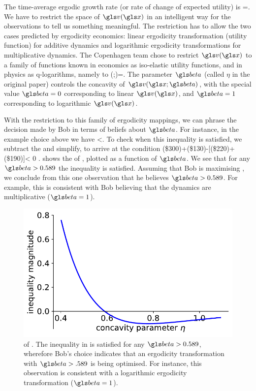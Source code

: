 The time-average ergodic growth rate (or rate of change of expected utility) is
\be
\g=\frac{\ave{\D \gv(\x)}}{\D\t}.
\ee
We have to restrict the space of $\gv(\x)$ in an intelligent way for the observations
to tell us something meaningful. The restriction has to allow the two cases
predicted by ergodicity economics: linear ergodicity transformation (utility function) 
for additive dynamics and logarithmic ergodicity transformations for multiplicative dynamics.
The Copenhagen team chose to restrict $\gv(\x)$ to
a family of functions known in economics as iso-elastic utility functions, and in 
physics as q-logarithms, namely to
\be
\gv(\x;\gbeta)=.
\ee
The parameter $\gbeta$ (called $\eta$ in the original paper) controls the concavity of $\gv(\x; \gbeta)$, with the special value
$\gbeta=0$ corresponding to linear $\gv(\x)$, and $\gbeta=1$ corresponding to logarithmic $\gv(\x)$.

With the restriction to this family of ergodicity mappings, we can phrase the decision 
made by Bob in terms of beliefs about $\gbeta$. For instance, in the example choice above we have
\be
{}<.
\ee
To check when this inequality is satisfied, we subtract the \RHS and simplify, to arrive at
the condition
\be
\gv(\$300)+\gv(\$130)-[\gv(\$220)+\gv(\$190)]< 0 .
\ee
{} shows the \LHS of , plotted as a function of $\gbeta$.
We see that for any $\gbeta>0.589$ the inequality is satisfied. Assuming that Bob is 
maximising , we conclude from this one observation
that he believes $\gbeta>0.589$. For example, this is consistent with Bob believing that the 
dynamics are multiplicative ($\gbeta=1$).
\begin{figure}
    \includegraphics[width=.5\textwidth]{./chapter_real/figs/eta_constraint.pdf}
    \caption{\LHS of . The inequality in  is 
    satisfied for any $\gbeta>0.589$, wherefore Bob's choice indicates that an 
    ergodicity transformation with $\gbeta>.589$ is being optimised.
    For instance, this observation is consistent with a logarithmic ergodicity transformation ($\gbeta=1$).}
\end{figure}

